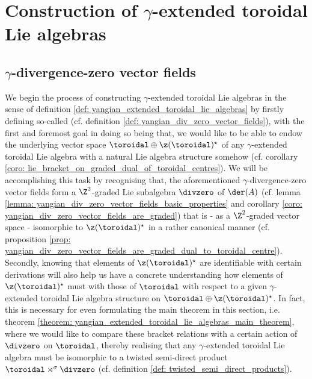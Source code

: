 \section{Construction of \texorpdfstring{$\gamma$}{}-extended toroidal Lie algebras}
    \subsection{\texorpdfstring{$\gamma$}{}-divergence-zero vector fields} \label{subsection: yangian_div_zero_vector_fields}
        We begin the process of constructing $\gamma$-extended toroidal Lie algebras in the sense of definition \ref{def: yangian_extended_toroidal_lie_algebras} by firstly defining so-called  (cf. definition \ref{def: yangian_div_zero_vector_fields}), with the first and foremost goal in doing so being that, we would like to be able to endow the underlying vector space $\toroidal \oplus \z(\toroidal)^{\star}$ of any $\gamma$-extended toroidal Lie algebra with a natural Lie algebra structure somehow (cf. corollary \ref{coro: lie_bracket_on_graded_dual_of_toroidal_centres}). We will be accomplishing this task by recognising that, the aforementioned $\gamma$-divergence-zero vector fields form a $\Z^2$-graded Lie subalgebra $\divzero$ of $\der(A)$ (cf. lemma \ref{lemma: yangian_div_zero_vector_fields_basic_properties} and corollary \ref{coro: yangian_div_zero_vector_fields_are_graded}) that is - as a $\Z^2$-graded vector space - isomorphic to $\z(\toroidal)^{\star}$ in a rather canonical manner (cf. proposition \ref{prop: yangian_div_zero_vector_fields_are_graded_dual_to_toroidal_centre}). Secondly, knowing that elements of $\z(\toroidal)^{\star}$ are identifiable with certain derivations will also help us have a concrete understanding how elements of $\z(\toroidal)^{\star}$ must  with those of $\toroidal$ with respect to a given $\gamma$-extended toroidal Lie algebra structure on $\toroidal \oplus \z(\toroidal)^{\star}$. In fact, this is necessary for even formulating the main theorem in this section, i.e. theorem \ref{theorem: yangian_extended_toroidal_lie_algebras_main_theorem}, where we would like to compare these bracket relations with a certain action of $\divzero$ on $\toroidal$, thereby realising that any $\gamma$-extended toroidal Lie algebra must be isomorphic to a twisted semi-direct product $\toroidal \rtimes^{\sigma} \divzero$ (cf. definition \ref{def: twisted_semi_direct_products}).
    
